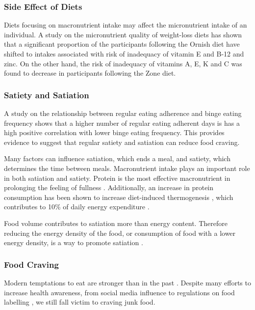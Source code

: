 \documentclass{article}
\begin{document}
\subsubsection{Side Effect of Diets}
Diets focusing on macronutrient intake may affect the micronutrient intake of an individual. A study on the micronutrient quality of weight-loss diets \cite{micro_quality} has shown that a significant proportion of the participants following the Ornish diet have shifted to intakes associated with risk of inadequacy of vitamin E and B-12 and zinc. On the other hand, the risk of inadequacy of vitamins A, E, K and C was found to decrease in participants following the Zone diet. 

\subsubsection{Satiety and Satiation}
A study on the relationship between regular eating adherence and binge eating frequency \cite{binge_freq} shows that a higher number of regular eating adherent days is has a high positive correlation with lower binge eating frequency. This provides evidence to suggest that regular satiety and satiation can reduce food craving.
\bigskip

\noindent Many factors can influence satiation, which ends a meal, and satiety, which determines the time between meals. Macronutrient intake plays an important role in both satiation and satiety. Protein is the most effective macronutrient in prolonging the feeling of fullness \cite{satiety_satiation}. Additionally, an increase in protein consumption has been shown to increase diet-induced thermogenesis \cite{satiety_satiation}, which contributes to 10\% of daily energy expenditure \cite{weight_expenditure}.
\bigskip

\noindent Food volume contributes to satiation more than energy content. Therefore reducing the energy density of the food, or consumption of food with a lower energy density, is a way to promote satiation \cite{satiety_satiation}. 
 \bigskip

\newpage
\subsubsection{Food Craving}
Modern temptations to eat are stronger than in the past \cite{tempted_brain}. Despite many efforts to increase health awareness, from social media influence to regulations on food labelling  \cite{food_label}, we still fall victim to craving junk food. 
\bigskip
\end{document}
